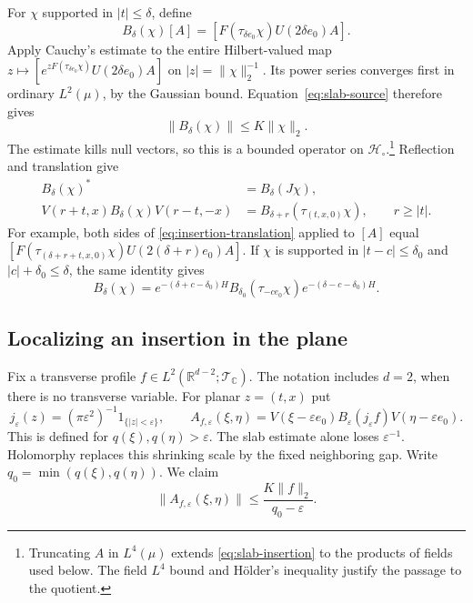 \documentclass[11pt, letterpaper, reqno]{amsart}
\theoremstyle{definition}
\theoremstyle{remark}
\newcommand{\bbC}{\mathbb{C}}
\newcommand{\bbR}{\mathbb{R}}
\newcommand{\calH}{\mathcal{H}}
\newcommand{\calT}{\mathcal{T}}
\begin{document}
For $\chi$ supported in $|t|\leq\delta$, define
\begin{equation}\label{eq:slab-insertion}
 B_\delta(\chi)[A]=[F(\tau_{\delta e_0}\chi)U(2\delta e_0)A].
\end{equation}
Apply Cauchy's estimate to the entire Hilbert-valued map
$z\mapsto[e^{zF(\tau_{\delta e_0}\chi)}U(2\delta e_0)A]$ on
$|z|=\|\chi\|_2^{-1}$. Its power series converges first in ordinary
$L^2(\mu)$, by the Gaussian bound. Equation~\eqref{eq:slab-source}
therefore gives
\begin{equation}\label{eq:insertion-bound}
 \|B_\delta(\chi)\|\leq K\|\chi\|_2.
\end{equation}
The estimate kills null vectors, so this is a bounded operator on
$\calH_\circ$.\footnote{Truncating $A$ in $L^4(\mu)$ extends
\eqref{eq:slab-insertion} to the products of fields used below.
The field $L^4$ bound and H\"older's inequality justify the passage
to the quotient.}
Reflection and translation give
\begin{align}
 B_\delta(\chi)^*&=B_\delta(J\chi),\label{eq:insertion-adjoint}\\
 V(r+t,x)B_\delta(\chi)V(r-t,-x)
   &=B_{\delta+r}(\tau_{(t,x,0)}\chi),\qquad r\geq|t|.
 \label{eq:insertion-translation}
\end{align}
For example, both sides of \eqref{eq:insertion-translation} applied to
$[A]$ equal
$[F(\tau_{(\delta+r+t,x,0)}\chi)U(2(\delta+r)e_0)A]$.
If $\chi$ is supported in $|t-c|\leq\delta_0$ and
$|c|+\delta_0\leq\delta$, the same identity gives
\begin{equation}\label{eq:insertion-localization}
 B_\delta(\chi)=e^{-(\delta+c-\delta_0)H}
 B_{\delta_0}(\tau_{-ce_0}\chi)e^{-(\delta-c-\delta_0)H}.
\end{equation}

\subsection{Localizing an insertion in the plane}\label{subsec:point}

Fix a transverse profile $f\in L^2(\bbR^{d-2};\calT_\bbC)$.
The notation includes $d=2$, when there is no transverse variable.
For planar $z=(t,x)$ put
\begin{equation}
 j_\varepsilon(z)=(\pi\varepsilon^2)^{-1}1_{\{|z|<\varepsilon\}},
 \qquad
 A_{f,\varepsilon}(\xi,\eta)
 =V(\xi-\varepsilon e_0)B_\varepsilon(j_\varepsilon f)
     V(\eta-\varepsilon e_0).
\end{equation}
This is defined for $q(\xi),q(\eta)>\varepsilon$. The slab estimate
alone loses $\varepsilon^{-1}$. Holomorphy replaces this shrinking
scale by the fixed neighboring gap. Write
$q_0=\min(q(\xi),q(\eta))$. We claim
\begin{equation}\label{eq:regularized-point-bound}
 \|A_{f,\varepsilon}(\xi,\eta)\|
       \leq \frac{K\|f\|_2}{q_0-\varepsilon}.
\end{equation}
\end{document}
